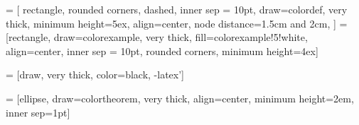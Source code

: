 \newcommand{\makeboxlabel}[1]{\fbox{#1}\hfill}%
\newenvironment{boxlabel}
  {\begin{list}
    {\arabic{boxlblcounter}}
    {\usecounter{boxlblcounter}
     \setlength{\labelwidth}{3em}
     \setlength{\labelsep}{0em}
     \setlength{\itemsep}{2pt}
     \setlength{\leftmargin}{1.5cm}
     \setlength{\rightmargin}{2cm}
     \setlength{\itemindent}{0em} 
     \let\makelabel=\makeboxlabel
    }
  }
{\end{list}}

 = [
  rectangle, rounded corners, dashed,
  inner sep = 10pt,
  draw=colordef, very thick,
  minimum height=5ex,
  align=center,
  node distance=1.5cm and 2cm,
  ]
   =
  [rectangle,
  draw=colorexample, very thick,
  fill=colorexample!5!white,
  align=center,
  inner sep = 10pt,
  rounded corners, 
  minimum height=4ex]
  
 = [draw, very thick, color=black, -latex']

 =
  [ellipse, draw=colortheorem,
  very thick,
  align=center,
  minimum height=2em, inner sep=1pt]

% 


  
